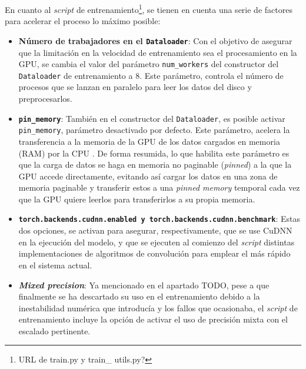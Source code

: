 En cuanto al \textit{script} de entrenamiento\footnote{URL de train.py y train\_ utils.py?}, se tienen en cuenta una serie de factores para acelerar el proceso lo máximo posible:
\begin{itemize}

\item \textbf{Número de trabajadores en el \texttt{Dataloader}}: Con el objetivo de asegurar que la limitación en la velocidad de entrenamiento sea el procesamiento en la GPU, se cambia el valor del parámetro \texttt{num\_workers} del constructor del \texttt{Dataloader} de entrenamiento a 8. Este parámetro, controla el número de procesos que se lanzan en paralelo para leer los datos del disco y preprocesarlos.

\item \textbf{\texttt{pin\_memory}}: También en el constructor del \texttt{Dataloader}, es posible activar \texttt{pin\_memory}, parámetro desactivado por defecto. Este parámetro, acelera la transferencia a la memoria de la GPU de los datos cargados en memoria (RAM) por la CPU \cite{harris2012}. De forma resumida, lo que habilita este parámetro es que la carga de datos se haga en memoria no paginable (\textit{pinned}) a la que la GPU accede directamente, evitando así cargar los datos en una zona de memoria paginable y transferir estos a una \textit{pinned memory} temporal cada vez que la GPU quiere leerlos para transferirlos a su propia memoria.

\item \textbf{\texttt{torch.backends.cudnn.enabled y \texttt{torch.backends.cudnn.benchmark}}}: Estas dos opciones, se activan para asegurar, respectivamente, que se use CuDNN en la ejecución del modelo, y que se ejecuten al comienzo del \textit{script} distintas implementaciones de algoritmos de convolución para emplear el más rápido en el sistema actual.

\item \textbf{\textit{Mixed precision}}: Ya mencionado en el apartado TODO, pese a que finalmente se ha descartado su uso en el entrenamiento debido a la inestabilidad numérica que introducía y los fallos que ocasionaba, el \textit{script} de entrenamiento incluye la opción de activar el uso de precisión mixta con el escalado pertinente.
\end{itemize}


